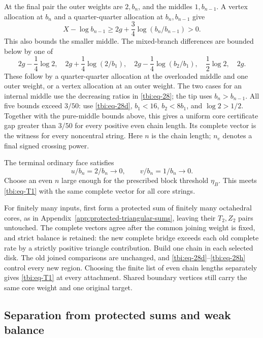 At the final pair the outer weights are \(2,b_n\), and the middles \(1,b_{n-1}\). A vertex allocation at \(b_n\) and a quarter-quarter allocation at \(b_n,b_{n-1}\) give
\begin{equation}\label{tbi:eq-28h}
X-\log b_{n-1}\ge2g+\frac34\log(b_n/b_{n-1})>0.
\end{equation}
This also bounds the smaller middle. The mixed-branch differences are bounded below by one of
\begin{equation}\label{tbi:eq-28i}
2g-\frac14\log2,\quad
2g+\frac14\log(2/b_1),\quad
2g-\frac14\log(b_2/b_1),\quad
\frac12\log2,\quad 2g.
\end{equation}
These follow by a quarter-quarter allocation at the overloaded middle and one outer weight, or a vertex allocation at an outer weight. The two cases for an internal middle use the decreasing ratios in \eqref{tbi:eq-28}; the tip uses \(b_n>b_{n-1}\). All five bounds exceed \(3/50\): use \eqref{tbi:eq-28d}, \(b_1<16\), \(b_2<8b_1\), and \(\log2>1/2\). Together with the pure-middle bounds above, this gives a uniform core certificate gap greater than \(3/50\) for every positive even chain length. Its complete vector is the witness for every noncentral string. Here \(n\) is the chain length; \(n_e\) denotes a final signed crossing power.

The terminal ordinary face satisfies
\begin{equation}\label{tbi:eq-29}
u/b_n=2/b_n\longrightarrow0,\qquad
v/b_n=1/b_n\longrightarrow0.
\end{equation}
Choose an even \(n\) large enough for the prescribed block threshold \(\eta_B\). This meets \eqref{tbi:eq-T1} with the same complete vector for all core strings.

For finitely many inputs, first form a protected sum of finitely many octahedral cores, as in Appendix~\ref{app:protected-triangular-sums}, leaving their \(T_2,Z_2\) pairs untouched. The complete vectors agree after the common joining weight is fixed, and strict balance is retained: the new complete bridge exceeds each old complete rate by a strictly positive triangle contribution. Build one chain in each selected disk. The old joined comparisons are unchanged, and \eqref{tbi:eq-28d}--\eqref{tbi:eq-28h} control every new region. Choosing the finite list of even chain lengths separately gives \eqref{tbi:eq-T1} at every attachment. Shared boundary vertices still carry the same core weight and one original target.

\subsection{Separation from protected sums and weak balance}\label{separation-from-protected-sums-and-weak-balance}

